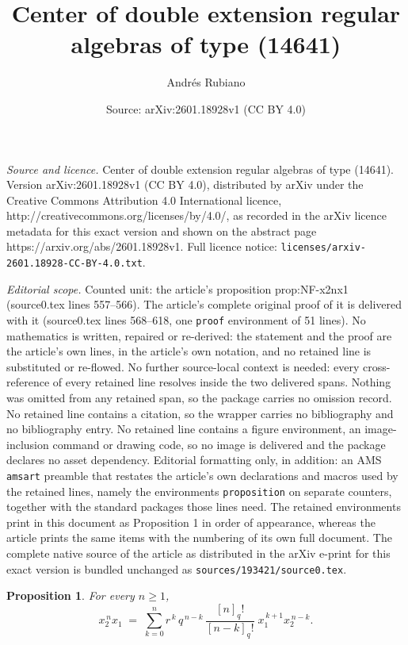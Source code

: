 \documentclass[10pt,a4paper]{amsart}
\title{Center of double extension regular algebras of type (14641)}
\author{Andr\'es Rubiano}
\date{Source: arXiv:2601.18928v1 (CC BY 4.0)}
\newtheorem{proposition}{Proposition}
\begin{document}
\maketitle

\noindent\emph{Source and licence.} Center of double extension regular algebras of type (14641). Version arXiv:2601.18928v1 (CC BY 4.0), distributed by arXiv under the Creative Commons Attribution 4.0 International licence, http://creativecommons.org/licenses/by/4.0/, as recorded in the arXiv licence metadata for this exact version and shown on the abstract page https://arxiv.org/abs/2601.18928v1. Full licence notice: \texttt{licenses/arxiv-2601.18928-CC-BY-4.0.txt}.\par\smallskip

\noindent\textit{Editorial scope.} Counted unit: the article's proposition prop:NF-x2nx1 (source0.tex lines 557--566). The article's complete original proof of it is delivered with it (source0.tex lines 568--618, one \texttt{proof} environment of 51 lines). No mathematics is written, repaired or re-derived: the statement and the proof are the article's own lines, in the article's own notation, and no retained line is substituted or re-flowed.  No further source-local context is needed: every cross-reference of every retained line resolves inside the two delivered spans.  Nothing was omitted from any retained span, so the package carries no omission record.  No retained line contains a citation, so the wrapper carries no bibliography and no bibliography entry.  No retained line contains a figure environment, an image-inclusion command or drawing code, so no image is delivered and the package declares no asset dependency.  Editorial formatting only, in addition: an AMS \texttt{amsart} preamble that restates the article's own declarations and macros used by the retained lines, namely the environments \texttt{proposition} on separate counters, together with the standard packages those lines need.  The retained environments print in this document as Proposition 1 in order of appearance, whereas the article prints the same items with the numbering of its own full document.  The complete native source of the article as distributed in the arXiv e-print for this exact version is bundled unchanged as \texttt{sources/193421/source0.tex}.
\begin{proposition}\label{prop:NF-x2nx1} For every $n\ge1$,
\[
x_2^{\,n}x_1
\;=\;
\sum_{k=0}^{n} 
r^{\,k}\,q^{\,n-k}\,
\frac{[n]_q!}{[n-k]_q!}\;
x_1^{\,k+1}x_2^{\,n-k}.
\]
\end{proposition}
\end{document}
